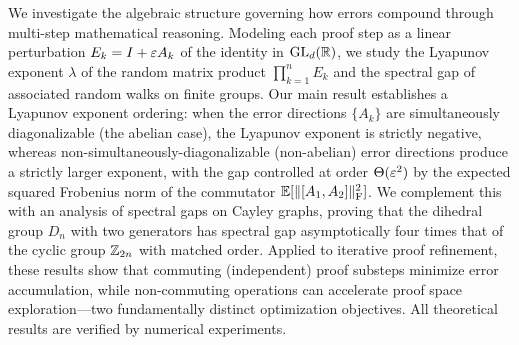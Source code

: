 We investigate the algebraic structure governing how errors compound through
multi-step mathematical reasoning. Modeling each proof step as a linear
perturbation $E_k = I + \varepsilon A_k$ of the identity in $\operatorname{GL}_d(\mathbb{R})$, we study
the Lyapunov exponent $\lambda$ of the random matrix product
$\prod_{k=1}^n E_k$ and the spectral gap of associated random walks on
finite groups.  Our main result establishes a Lyapunov exponent ordering:
when the error directions $\{A_k\}$ are simultaneously diagonalizable
(the abelian case), the Lyapunov exponent is strictly negative, whereas
non-simultaneously-diagonalizable (non-abelian) error directions produce
a strictly larger exponent, with the gap controlled at order $\Theta(\varepsilon^2)$
by the expected squared Frobenius norm of the commutator $\mathbb{E}[\lVert [A_1, A_2] \rVert_{\mathrm{F}}^2]$.
We complement this with an analysis of spectral gaps on Cayley graphs,
proving that the dihedral group $D_n$ with two generators has spectral gap
asymptotically four times that of the cyclic group $\mathbb{Z}_{2n}$ with matched
order.  Applied to iterative proof refinement, these results show that
commuting (independent) proof substeps minimize error accumulation, while
non-commuting operations can accelerate proof space exploration---two
fundamentally distinct optimization objectives.  All theoretical results
are verified by numerical experiments.
